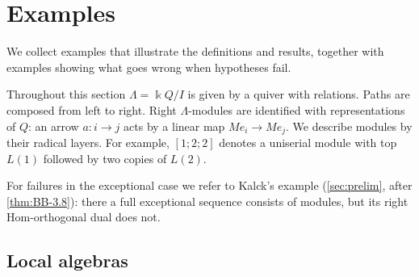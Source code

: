 \documentclass[11pt,reqno]{amsart}
\theoremstyle{plain}
\theoremstyle{definition}
\theoremstyle{remark}
\newcommand{\kk}{\Bbbk}
\begin{document}
\section{Examples}\label{sec:examples}

We collect examples that illustrate the definitions and results, together with examples showing what goes wrong when hypotheses fail.

Throughout this section $\Lambda=\kk Q/I$ is given by a quiver with relations. Paths are composed from left to right. Right $\Lambda$-modules are identified with representations of $Q$: an arrow $a\colon i\to j$ acts by a linear map $Me_i\to Me_j$. We describe modules by their radical layers. For example, $[1;2;2]$ denotes a uniserial module with top $L(1)$ followed by two copies of $L(2)$.

For failures in the exceptional case we refer to Kalck's example (\cref{sec:prelim}, after \cref{thm:BB-3.8}): there a full exceptional sequence consists of modules, but its right Hom-orthogonal dual does not.

\subsection{Local algebras}
\end{document}
